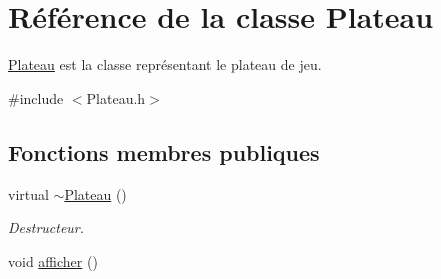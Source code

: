 \hypertarget{classPlateau}{\section{\-Référence de la classe \-Plateau}
\label{classPlateau}
}


\hyperlink{classPlateau}{\-Plateau} est la classe représentant le plateau de jeu.  




{\ttfamily \#include $<$\-Plateau.\-h$>$}

\subsection*{\-Fonctions membres publiques}
\begin{DoxyCompactItemize}
\item 
\hypertarget{classPlateau_a0e6ae72e4d7e9923f996c1247e6a6c8b}{virtual \hyperlink{classPlateau_a0e6ae72e4d7e9923f996c1247e6a6c8b}{$\sim$\-Plateau} ()}\label{classPlateau_a0e6ae72e4d7e9923f996c1247e6a6c8b}

\begin{DoxyCompactList}\small\item\em \-Destructeur. \end{DoxyCompactList}\item 
\hypertarget{classPlateau_a122c12319a8843a493fa06fe4f6e55d4}{void \hyperlink{classPlateau_a122c12319a8843a493fa06fe4f6e55d4}{afficher} ()}\label{classPlateau_a122c12319a8843a493fa06fe4f6e55d4}


\end{DoxyCompactItemize}
